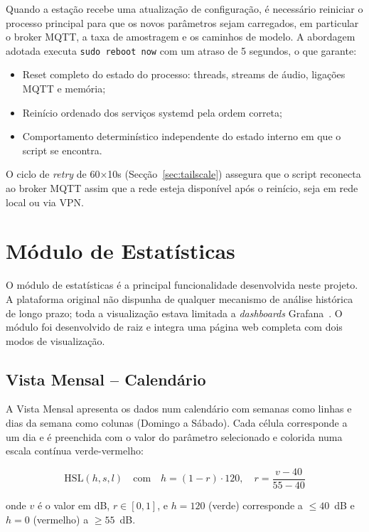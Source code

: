 \documentclass[12pt,a4paper]{report}
\begin{document}
Quando a estação recebe uma atualização de configuração, é necessário reiniciar o processo principal para que os novos parâmetros sejam carregados,  em particular o broker MQTT, a taxa de amostragem e os caminhos de modelo. A abordagem adotada executa \texttt{sudo reboot now} com um atraso de 5 segundos, o que garante:

\begin{itemize}[nosep]
  \item Reset completo do estado do processo: threads, streams de áudio, ligações MQTT e memória;
  \item Reinício ordenado dos serviços systemd pela ordem correta;
  \item Comportamento determinístico independente do estado interno em que o script se encontra.
\end{itemize}

O ciclo de \textit{retry} de 60×10s (Secção~\ref{sec:tailscale}) assegura que o script reconecta ao broker MQTT assim que a rede esteja disponível após o reinício, seja em rede local ou via VPN.

\section{Módulo de Estatísticas}
\label{sec:stats}

O módulo de estatísticas é a principal funcionalidade desenvolvida neste projeto. A plataforma original não dispunha de qualquer mecanismo de análise histórica de longo prazo; toda a visualização estava limitada a \textit{dashboards} Grafana~\cite{grafana}. O módulo foi desenvolvido de raiz e integra uma página web completa com dois modos de visualização.

\subsection{Vista Mensal -- Calendário}

A Vista Mensal apresenta os dados num calendário com semanas como linhas e dias da semana como colunas (Domingo a Sábado). Cada célula corresponde a um dia e é preenchida com o valor do parâmetro selecionado e colorida numa escala contínua verde-vermelho:

\begin{equation}
\text{HSL}(h, s, l) \quad \text{com} \quad h = (1 - r) \cdot 120, \quad r = \frac{v - 40}{55 - 40}
\end{equation}

onde $v$ é o valor em dB, $r \in [0,1]$, e $h = 120$ (verde) corresponde a $\leq 40$~dB e $h = 0$ (vermelho) a $\geq 55$~dB.
\end{document}
